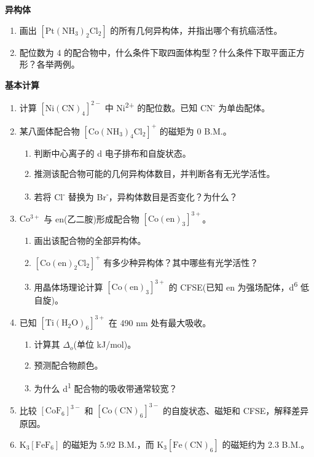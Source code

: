 \documentclass[a4paper,11pt]{ctexart}
\providecommand{\tightlist}{\setlength{\itemsep}{0pt}\setlength{\parskip}{0pt}}
\newcommand{\箭}{\ensuremath{\rightarrow}}
\newcommand{\左箭}{\ensuremath{\leftarrow}}
\newcommand{\上箭}{\ensuremath{\uparrow}}
\newcommand{\下箭}{\ensuremath{\downarrow}}
\newcommand{\衡}{\ensuremath{\rightleftharpoons}}
\newcommand{\双箭}{\ensuremath{\leftrightarrow}}
\newcommand{\约等于}{\ensuremath{\approx}}
\newcommand{\小于等于}{\ensuremath{\leq}}
\newcommand{\大于等于}{\ensuremath{\geq}}
\newcommand{\不等于}{\ensuremath{\neq}}
\newcommand{\西格马}{\ensuremath{\sigma}}
\newcommand{\派}{\ensuremath{\pi}}
\begin{document}
\textbf{异构体}

\begin{enumerate}
\def\labelenumi{\arabic{enumi}.}
\setcounter{enumi}{9}
\item
  画出 \([\mathrm{Pt(NH_3)_2Cl_2}]\) 的所有几何异构体，并指出哪个有抗癌活性。
\item
  配位数为 4 的配合物中，什么条件下取四面体构型？什么条件下取平面正方形？各举两例。
\end{enumerate}

\textbf{基本计算}

\begin{enumerate}
\def\labelenumi{\arabic{enumi}.}
\setcounter{enumi}{11}
\item
  计算 \([\mathrm{Ni(CN)_4}]^{2-}\) 中 Ni\textsuperscript{2+} 的配位数。已知 CN\textsuperscript{-} 为单齿配体。
\item
  某八面体配合物 \(\mathrm{[Co(NH_3)_4Cl_2]^+}\) 的磁矩为 0 B.M.。

  \begin{enumerate}
  \def\labelenumii{(\alph{enumii})}
  \tightlist
  \item
    判断中心离子的 d 电子排布和自旋状态。
  \item
    推测该配合物可能的几何异构体数目，并判断各有无光学活性。
  \item
    若将 Cl\textsuperscript{-} 替换为 Br\textsuperscript{-}，异构体数目是否变化？为什么？
  \end{enumerate}
\item
  \(\mathrm{Co^{3+}}\) 与 en(乙二胺)形成配合物 \(\mathrm{[Co(en)_3]^{3+}}\)。

  \begin{enumerate}
  \def\labelenumii{(\alph{enumii})}
  \tightlist
  \item
    画出该配合物的全部异构体。
  \item
    \(\mathrm{[Co(en)_2Cl_2]^+}\) 有多少种异构体？其中哪些有光学活性？
  \item
    用晶体场理论计算 \(\mathrm{[Co(en)_3]^{3+}}\) 的 CFSE(已知 en 为强场配体，d\textsuperscript{6} 低自旋)。
  \end{enumerate}
\item
  已知 \(\mathrm{[Ti(H_2O)_6]^{3+}}\) 在 490 nm 处有最大吸收。

  \begin{enumerate}
  \def\labelenumii{(\alph{enumii})}
  \tightlist
  \item
    计算其 \(\Delta_o\)(单位 kJ/mol)。
  \item
    预测配合物颜色。
  \item
    为什么 d\textsuperscript{1} 配合物的吸收带通常较宽？
  \end{enumerate}
\item
  比较 \([\mathrm{CoF_6}]^{3-}\) 和 \([\mathrm{Co(CN)_6}]^{3-}\) 的自旋状态、磁矩和 CFSE，解释差异原因。
\item
  \(\mathrm{K_3[FeF_6]}\) 的磁矩为 5.92 B.M.，而 \(\mathrm{K_3[Fe(CN)_6]}\) 的磁矩约为 2.3 B.M.。


\end{enumerate}
\end{document}
